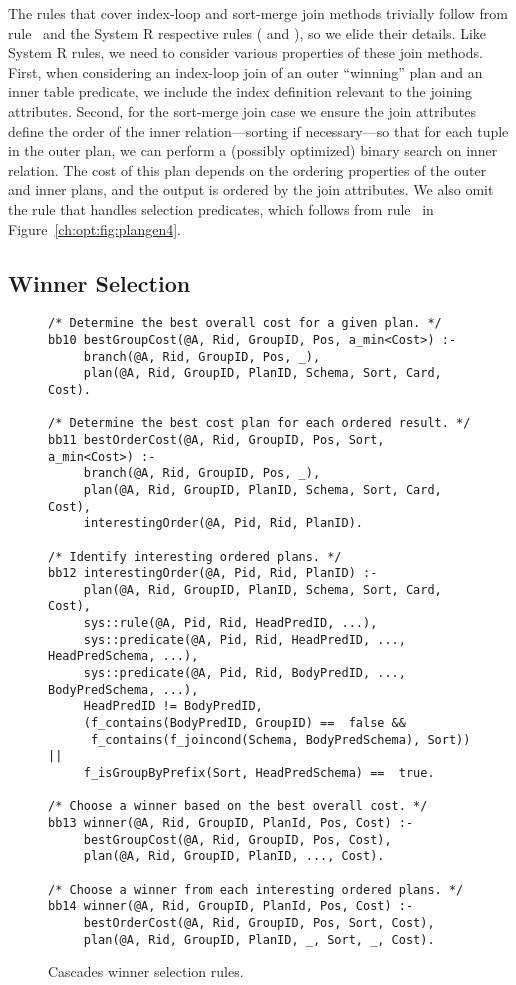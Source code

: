The rules that cover index-loop and sort-merge join methods trivially follow
from rule~ and the System R respective rules ( and ),
so we elide their details.  Like System R rules, we need to consider various
properties of these join methods.  First, when considering an index-loop join
of an outer ``winning'' plan and an inner table predicate, we include the index
definition relevant to the joining attributes.  Second, for the sort-merge join
case we ensure the join attributes define the order of the inner
relation---sorting if necessary---so that for each tuple in the outer plan, we
can perform a (possibly optimized) binary search on inner relation.  The cost
of this plan depends on the ordering properties of the outer and inner plans,
and the output is ordered by the join attributes.  We also omit the rule that
handles selection predicates, which follows from rule~ in
Figure~\ref{ch:opt:fig:plangen4}.

\subsection{Winner Selection}
\label{ch:opt:sec:cascades_winner}

\begin{figure*}
\ssp
\centering
\begin{lstlisting}
/* Determine the best overall cost for a given plan. */
bb10 bestGroupCost(@A, Rid, GroupID, Pos, a_min<Cost>) :-
     branch(@A, Rid, GroupID, Pos, _),
     plan(@A, Rid, GroupID, PlanID, Schema, Sort, Card, Cost).

/* Determine the best cost plan for each ordered result. */
bb11 bestOrderCost(@A, Rid, GroupID, Pos, Sort, a_min<Cost>) :-
     branch(@A, Rid, GroupID, Pos, _),
     plan(@A, Rid, GroupID, PlanID, Schema, Sort, Card, Cost),
     interestingOrder(@A, Pid, Rid, PlanID).

/* Identify interesting ordered plans. */ 
bb12 interestingOrder(@A, Pid, Rid, PlanID) :-
     plan(@A, Rid, GroupID, PlanID, Schema, Sort, Card, Cost),
     sys::rule(@A, Pid, Rid, HeadPredID, ...),
     sys::predicate(@A, Pid, Rid, HeadPredID, ..., HeadPredSchema, ...),
     sys::predicate(@A, Pid, Rid, BodyPredID, ..., BodyPredSchema, ...),
     HeadPredID != BodyPredID, 
     (f_contains(BodyPredID, GroupID) ==  false &&
      f_contains(f_joincond(Schema, BodyPredSchema), Sort)) ||
     f_isGroupByPrefix(Sort, HeadPredSchema) ==  true.

/* Choose a winner based on the best overall cost. */
bb13 winner(@A, Rid, GroupID, PlanId, Pos, Cost) :-
     bestGroupCost(@A, Rid, GroupID, Pos, Cost),
     plan(@A, Rid, GroupID, PlanID, ..., Cost).

/* Choose a winner from each interesting ordered plans. */
bb14 winner(@A, Rid, GroupID, PlanId, Pos, Cost) :-
     bestOrderCost(@A, Rid, GroupID, Pos, Sort, Cost),
     plan(@A, Rid, GroupID, PlanID, _, Sort, _, Cost).
\end{lstlisting}
\caption{\label{ch:opt:fig:cascades_winner} Cascades winner selection rules.}
\end{figure*}

